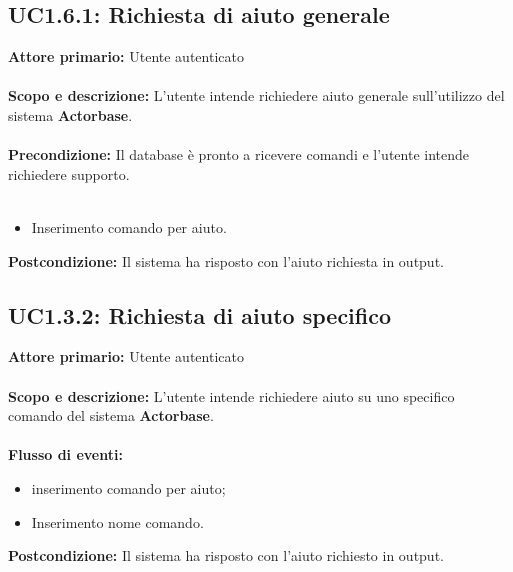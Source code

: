 \documentclass{scalatekids-article}
\begin{document}
\subsection{UC1.6.1: Richiesta di aiuto generale}
\textbf{Attore primario:} Utente autenticato\\ \\
\textbf{Scopo e descrizione:} L'utente intende richiedere aiuto generale sull'utilizzo del sistema \textbf{Actorbase}.\\ \\
\textbf{Precondizione:} Il database è pronto a ricevere comandi e l'utente intende richiedere supporto.\\ \\
\begin{itemize}
\item Inserimento comando per aiuto.
\end{itemize}
\textbf{Postcondizione:} Il sistema ha risposto con l'aiuto richiesta in output.
\subsection{UC1.3.2: Richiesta di aiuto specifico}
\textbf{Attore primario:} Utente autenticato\\ \\
\textbf{Scopo e descrizione:} L'utente intende richiedere aiuto su uno specifico comando del sistema \textbf{Actorbase}.\\ \\
\textbf{Flusso di eventi:}
\begin{itemize}
\item inserimento comando per aiuto;
\item Inserimento nome comando.
\end{itemize}
\textbf{Postcondizione:} Il sistema ha risposto con l'aiuto richiesto in output.
\end{document}
